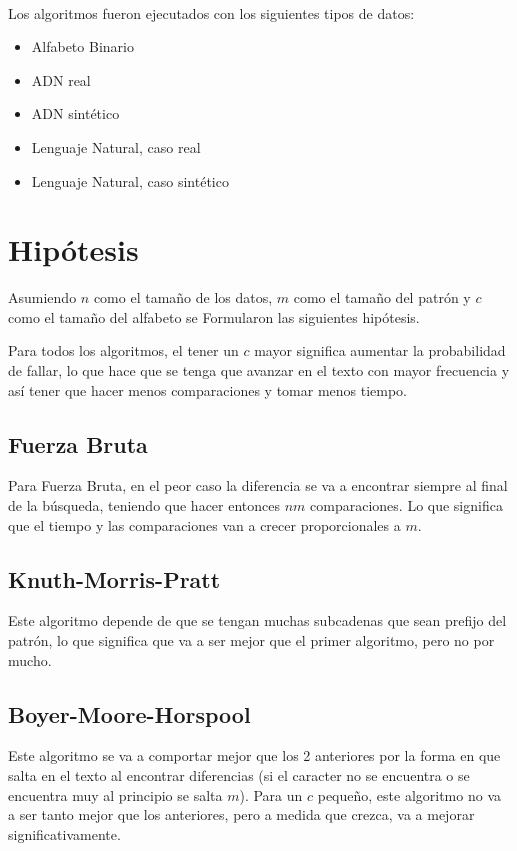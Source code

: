\documentclass[14pt,letterpaper,hidelinks]{extarticle}
\begin{document}
	\paragraph{} Los algoritmos fueron ejecutados con los siguientes tipos de datos:
	\begin{itemize}
			\item Alfabeto Binario
			\item ADN real
			\item ADN sintético
			\item Lenguaje Natural, caso real
			\item Lenguaje Natural, caso sintético
	\end{itemize}

\section{Hipótesis}
	Asumiendo $n$ como el tamaño de los datos, $m$ como el tamaño del patrón y $c$ como el tamaño del alfabeto se
	Formularon las siguientes hipótesis.

	Para todos los algoritmos, el tener un $c$ mayor significa aumentar la probabilidad de fallar, lo que hace que se tenga que
	avanzar en el texto con mayor frecuencia y así tener que hacer menos comparaciones y tomar menos tiempo.
	\subsection{Fuerza Bruta}
		Para Fuerza Bruta, en el peor caso la diferencia se va a encontrar siempre al final de la búsqueda,
		teniendo que hacer entonces $nm$ comparaciones. Lo que significa que el tiempo y las comparaciones van a crecer
		proporcionales a $m$.

	\subsection{Knuth-Morris-Pratt}
		Este algoritmo depende de que se tengan muchas subcadenas que sean prefijo del patrón, lo que significa que va a ser mejor que
		el primer algoritmo, pero no por mucho.

	\subsection{Boyer-Moore-Horspool}
		Este algoritmo se va a comportar mejor que los 2 anteriores por la forma en que salta en el texto
		al encontrar diferencias (si el caracter no se encuentra o se encuentra muy al principio se salta $m$).
		Para un $c$ pequeño, este algoritmo no va a ser tanto mejor que los anteriores, pero a medida que crezca,
		va a mejorar significativamente.
\end{document}
